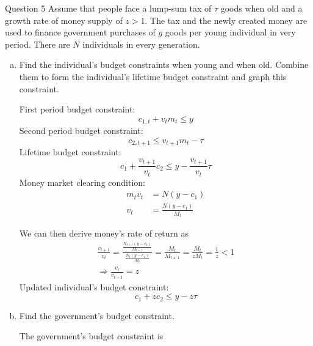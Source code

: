 \documentclass[a4paper]{article}
\newif\IfInSansMode
\numberwithin{equation}{section}
\numberwithin{figure}{section}
\begin{document}
	\begin{questionbox}{Question 5}
		Assume that people face a lump-sum tax of \( \tau \) goods when old and a growth rate of money supply of \( z > 1 \). The tax and the newly created money are used to finance government purchases of \( g \) goods per young individual in very period. There are \( N \) individuals in every generation.
		\begin{enumerate}[(a)]
			\item Find the individual's budget constraints when young and when old. Combine them to form the individual's lifetime budget constraint and graph this constraint.
			\begin{explanationbox}
				First period budget constraint:
				\[
					c_{1,t} + v_t m_t \leq y
				\]
				Second period budget constraint:
				\[
					c_{2,t+1} \leq v_{t+1} m_t - \tau
				\]
				Lifetime budget constraint:
				\[
					c_1 + \frac{v_{t+1}}{v_t} c_2 \leq y - \frac{v_{t+1}}{v_t} \tau
				\]
				Money market clearing condition:
				\begin{align*}
					m_t v_t &= N (y-c_1) \\
					v_t &= \frac{N(y-c_1)}{M_t}
				\end{align*}
			\end{explanationbox}
			\begin{explanationbox}
				We can then derive money's rate of return as
				\begin{gather*}
					\frac{v_{t+1}}{v_t} = \frac{\frac{N_{t+1} (y-c_1)}{M_{t+1}}}{\frac{N_t (y-c_1)}{M_t}} = \frac{M_t}{M_{t+1}} = \frac{M_t}{zM_t} = \frac{1}{z} < 1 \\
					\Rightarrow \frac{v_t}{v_{t+1}} = z
				\end{gather*}
				Updated individual's budget constraint:
				\[ 
					c_1 + zc_2 \leq y - z \tau 
				\]
				\begin{figure}[H]
					\centering
				\end{figure}
			\end{explanationbox}
			\item Find the government's budget constraint.
			\begin{explanationbox}
				The government's budget constraint is

\end{explanationbox}
\end{enumerate}
\end{questionbox}
\end{document}
